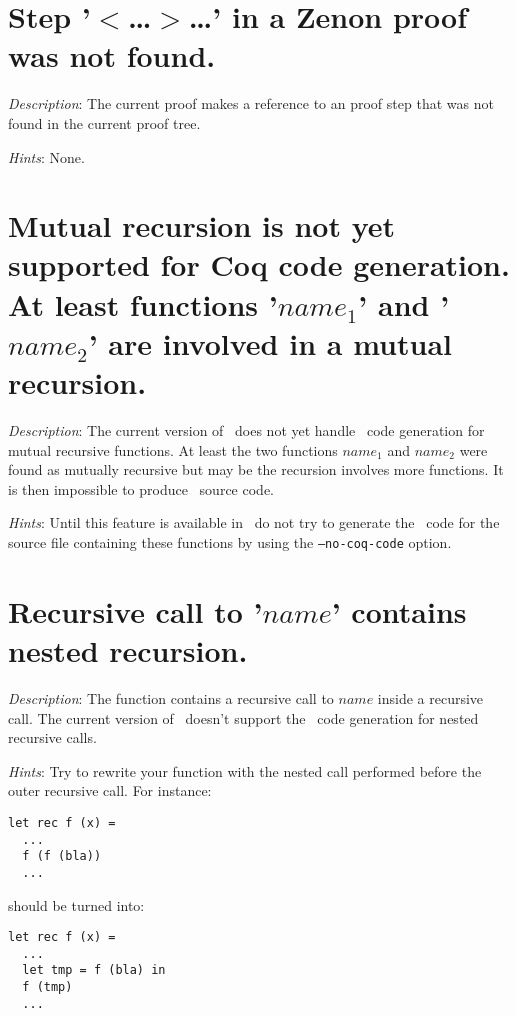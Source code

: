 \section*{Step '$<$\ldots$>$\ldots' in a Zenon proof was not found.}

{\em Description}: The current proof makes a reference to an
proof step that was not found in the current proof tree.

{\em Hints}: None.


\section*{Mutual recursion is not yet supported for Coq code
  generation. At least functions '$name_1$' and '$name_2$' are
  involved in a mutual recursion.}

{\em Description}: The current version of \focal\ does not yet handle
\coq\ code generation for mutual recursive functions. At least the two
functions $name_1$ and $name_2$ were found as mutually recursive but
may be the recursion involves more functions. It is then impossible to
produce \coq\ source code.


{\em Hints}: Until this feature is available in \focal\, do not try to
generate the \coq\ code for the source file containing these functions
by using the {\tt --no-coq-code} option.


\section*{Recursive call to '$name$' contains nested recursion.}

{\em Description}: The function contains a recursive call to $name$
inside a recursive call. The current version of \focal\ doesn't
support the \coq\ code generation for nested recursive calls.

{\em Hints}: Try to rewrite your function with the nested call
performed before the outer recursive call. For instance:
{\scriptsize
\begin{lstlisting}
let rec f (x) =
  ...
  f (f (bla))
  ...
\end{lstlisting}
}
should be turned into:
{\scriptsize
\begin{lstlisting}
let rec f (x) =
  ...
  let tmp = f (bla) in
  f (tmp)
  ...
\end{lstlisting}
}



